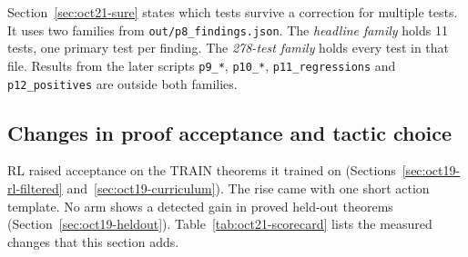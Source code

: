 \documentclass[11pt]{article}
\newcommand{\pth}[1]{\nolinkurl{#1}}
\begin{document}
Section~\ref{sec:oct21-sure} states which tests survive a correction for multiple tests.
It uses two families from \pth{out/p8_findings.json}.
The \emph{headline family} holds 11 tests, one primary test per finding.
The \emph{278-test family} holds every test in that file.
Results from the later scripts \pth{p9_*}, \pth{p10_*}, \pth{p11_regressions} and \pth{p12_positives} are outside both families.

\subsection{Changes in proof acceptance and tactic choice}
\label{sec:oct21-short}

RL raised acceptance on the TRAIN theorems it trained on (Sections~\ref{sec:oct19-rl-filtered} and~\ref{sec:oct19-curriculum}).
The rise came with one short action template.
No arm shows a detected gain in proved held-out theorems (Section~\ref{sec:oct19-heldout}).
Table~\ref{tab:oct21-scorecard} lists the measured changes that this section adds.
\end{document}
